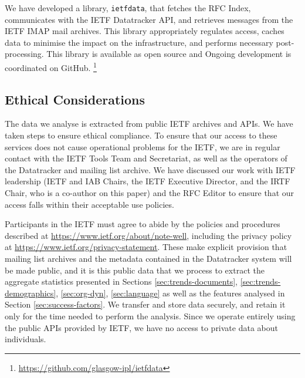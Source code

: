 \documentclass[twocolumn,10pt]{article}
\newcommand{\pb}[1]{\vspace{0.75ex}\noindent{\textbf{#1}}}
\begin{document}


\pb{Reproducibility and data access:}
We have developed a library, \texttt{ietfdata}, that fetches the RFC
Index, communicates with the IETF Datatracker API, and retrieves messages
from the IETF IMAP mail archives. This library appropriately regulates
access, caches data to minimise the impact on the infrastructure, and
performs necessary post-processing. This library is available as open
source and Ongoing development is coordinated on GitHub.%
\footnote{\url{https://github.com/glasgow-ipl/ietfdata}}


\subsection{Ethical Considerations}
\label{sec:ethics}


The data we analyse is extracted from public IETF archives and APIs.  We
have taken steps to ensure ethical compliance.  To ensure that our access
to these services does not cause operational problems for the IETF, we are
in regular contact with the IETF Tools Team and Secretariat, as well as the
operators of the Datatracker and mailing list archive.  We have
discussed our work with IETF leadership (IETF and IAB Chairs, the IETF
Executive Director, and the IRTF Chair, who is a co-author on this paper)
and the RFC Editor to ensure that our access falls within their acceptable
use policies.

Participants in the IETF must agree to abide by the policies and procedures
described at \url{https://www.ietf.org/about/note-well}, including the privacy
policy at \url{https://www.ietf.org/privacy-statement}. These make explicit
provision that mailing list archives and the metadata contained in the
Datatracker system will be made public, and it is this public data that
we process to extract the aggregate statistics presented in Sections
\ref{sec:trends-documents}, \ref{sec:trends-demographics}, \ref{sec:org-dyn},
\ref{sec:language} as well as the features analysed in Section
\ref{sec:success-factors}. We transfer and store data securely, and retain
it only for the time needed to perform the analysis.  Since we operate
entirely using the public APIs provided by IETF, we have no access to
private data about individuals.
\end{document}
